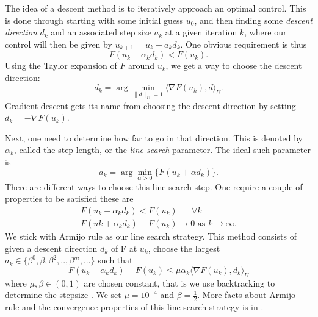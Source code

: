 The idea of a descent method is to iteratively approach an optimal control. This is done through starting with some initial guess $u_0$, and then finding some \emph{descent direction} $d_k$ and an associated step size $a_k$ at a given iteration $k$, where our control will then be given by $u_{k+1} = u_{k} + a_k d_k$. One obvious requirement is thus
\begin{equation*}
    F(u_k + \alpha_kd_k) < F(u_k).
\end{equation*}
Using the Taylor expansion of $F$ around $u_k$, we get a way to choose the descent direction:
\begin{equation*}
    d_k = \arg\min_{\|d\|_U=1} \langle \nabla F(u_k), d \rangle_U.
\end{equation*}
Gradient descent gets its name from choosing the descent direction by setting $d_k = -\nabla F(u_k)$.

Next, one need to determine how far to go in that direction. This is denoted by $\alpha_k$, called the step length, or the \textit{line search} parameter. The ideal such parameter is 
\begin{equation*}
    a_k = \arg \min_{\alpha>0} \{ F(u_k + \alpha d_k) \}.
\end{equation*}
There are different ways to choose this line search step. One require a couple of properties to be satisfied these are
\begin{align*}
    F(u_k + \alpha_kd_k) < F(u_k) \text{  } \quad\forall k \\
    F(uk + \alpha_k d_k) - F(u_k) \rightarrow 0 \text{ as } k\rightarrow \infty.
\end{align*}
We stick with Armijo rule as our line search strategy. This method consists of given a descent direction $d_k$ of F at $u_k$, choose the largest $a_k \in \{ \beta^0, \beta, \beta^2,..,\beta^m,... \}$ such that
\begin{equation}\label{eq:armijo}
    F (u_k + \alpha_kd_k) - F(u_k) \leq \mu \alpha_k \langle \nabla F(u_k),d_k \rangle_{U}
\end{equation}
where $\mu,\beta  \in (0,1)$ are chosen constant, that is we use backtracking to determine the stepsize \cite{iterativeMethods}. We set $\mu = 10^{-4}$ and $\beta = \frac{1}{2}$. More facts about Armijo rule and the convergence properties of this line search strategy is in \cite{numMethods, iterativeMethods}.

